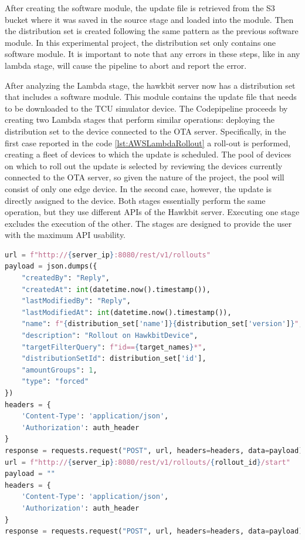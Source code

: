 After creating the software module, the update file is retrieved from the S3 bucket where it was saved in the source stage and loaded into the module. Then the distribution set is created following the same pattern as the previous software module. In this experimental project, the distribution set only contains one software module. It is important to note that any errors in these steps, like in any lambda stage, will cause the pipeline to abort and report the error.

After analyzing the Lambda stage, the hawkbit server now has a distribution set that includes a software module. This module contains the update file that needs to be downloaded to the TCU simulator device. The Codepipeline proceeds by creating two Lambda stages that perform similar operations: deploying the distribution set to the device connected to the OTA server. Specifically, in the first case reported in the code \ref{lst:AWSLambdaRollout} a roll-out is performed, creating a fleet of devices to which the update is scheduled. The pool of devices on which to roll out the update is selected by reviewing the devices currently connected to the OTA server, so given the nature of the project, the pool will consist of only one edge device. In the second case, however, the update is directly assigned to the device. Both stages essentially perform the same operation, but they use different APIs of the Hawkbit server. Executing one stage excludes the execution of the other. The stages are designed to provide the user with the maximum API usability. 
\begin{lstlisting}[language=Python, caption={Lambda code for the roll out creation and execution}, label=lst:AWSLambdaRollout]
url = f"http://{server_ip}:8080/rest/v1/rollouts"
payload = json.dumps({
    "createdBy": "Reply",
    "createdAt": int(datetime.now().timestamp()),
    "lastModifiedBy": "Reply",
    "lastModifiedAt": int(datetime.now().timestamp()),
    "name": f"{distribution_set['name']}{distribution_set['version']}",
    "description": "Rollout on HawkbitDevice",
    "targetFilterQuery": f"id=={target_names}*",
    "distributionSetId": distribution_set['id'],
    "amountGroups": 1,
    "type": "forced"
})
headers = {
    'Content-Type': 'application/json',
    'Authorization': auth_header
}
response = requests.request("POST", url, headers=headers, data=payload)
url = f"http://{server_ip}:8080/rest/v1/rollouts/{rollout_id}/start"
payload = ""
headers = {
    'Content-Type': 'application/json',
    'Authorization': auth_header
}
response = requests.request("POST", url, headers=headers, data=payload)
\end{lstlisting}


